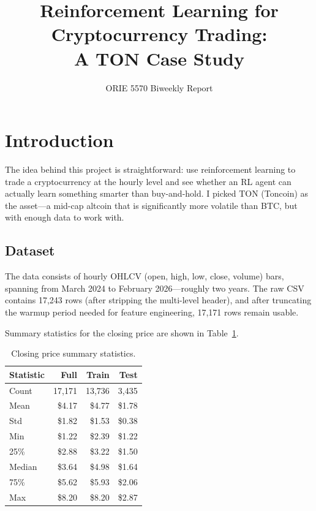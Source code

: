 \documentclass[11pt,a4paper]{article}
\title{\textbf{Reinforcement Learning for Cryptocurrency Trading:\\A TON Case Study}}
\author{ORIE 5570 Biweekly Report}
\date{}
\begin{document}
\maketitle
\thispagestyle{empty}

\section{Introduction}

The idea behind this project is straightforward: use reinforcement learning to trade a cryptocurrency at the hourly level and see whether an RL agent can actually learn something smarter than buy-and-hold. I picked TON (Toncoin) as the asset---a mid-cap altcoin that is significantly more volatile than BTC, but with enough data to work with.

\subsection{Dataset}

The data consists of hourly OHLCV (open, high, low, close, volume) bars, spanning from March 2024 to February 2026---roughly two years. The raw CSV contains 17,243 rows (after stripping the multi-level header), and after truncating the warmup period needed for feature engineering, 17,171 rows remain usable.

Summary statistics for the closing price are shown in Table~\ref{tab:price-stats}.

\begin{table}[H]
\centering
\caption{Closing price summary statistics.}
\label{tab:price-stats}
\begin{tabular}{lrrr}
\toprule
Statistic & Full & Train & Test \\
\midrule
Count     & 17,171 & 13,736 & 3,435 \\
Mean      & \$4.17 & \$4.77 & \$1.78 \\
Std       & \$1.82 & \$1.53 & \$0.38 \\
Min       & \$1.22 & \$2.39 & \$1.22 \\
25\%      & \$2.88 & \$3.22 & \$1.50 \\
Median    & \$3.64 & \$4.98 & \$1.64 \\
75\%      & \$5.62 & \$5.93 & \$2.06 \\
Max       & \$8.20 & \$8.20 & \$2.87 \\
\bottomrule
\end{tabular}
\end{table}
\end{document}
